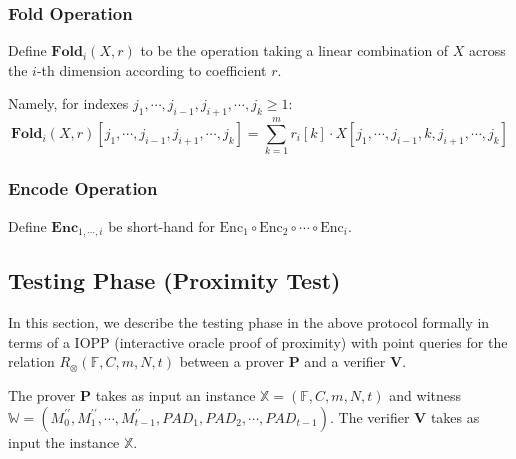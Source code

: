 \subsubsection{Fold Operation}

Define $\textbf{Fold}_i(X, r)$ to be the operation taking a linear combination of $X$ across the $i$-th dimension according to coefficient $r$. 

Namely, for indexes $j_1, \cdots, j_{i-1}, j_{i+1}, \cdots , j_{k} \ge 1$:
$$
\textbf{Fold}_i(X, r)[j_1, \cdots, j_{i-1}, j_{i+1}, \cdots , j_{k}] = \sum_{k=1}^{m} r_{i}[k] \cdot X[j_1, \cdots, j_{i-1}, k, j_{i+1}, \cdots , j_{k}]
$$

\subsubsection{Encode Operation}

Define $\textbf{Enc}_{1,\cdots,i}$ be short-hand for $\text{Enc}_1 \circ \text{Enc}_2 \circ \cdots \circ \text{Enc}_{i}$.

\subsection{Testing Phase (Proximity Test)}

In this section, we describe the testing phase in the above protocol formally in terms of a IOPP (interactive oracle proof of proximity) with point queries for the relation $R_\otimes(\mathbb{F}, C, m, N, t)$ between a prover $\textbf{P}$ and a verifier $\textbf{V}$.

The prover $\textbf{P}$ takes as input an instance $\mathbb{X} = (\mathbb{F}, C, m, N, t)$ and witness $\mathbb{W} = (M_0^{\prime\prime}, M_1^{\prime\prime}, \cdots, M_{t-1}^{\prime\prime}, PAD_1, PAD_2, \cdots, PAD_{t-1})$. The verifier $\textbf{V}$ takes as input the instance $\mathbb{X}$.

